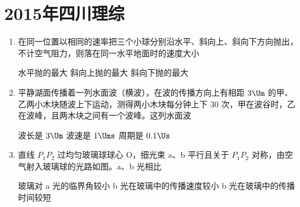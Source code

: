 \documentclass[\gkver]{gaokaozhenti}
\begin{document}
\chapter{2015年四川理综}

\begin{enumerate}
\item
在同一位置以相同的速率把三个小球分别沿水平、斜向上、斜向下方向抛出，不计空气阻力，则落在同一水平地面时的速度大小

{水平抛的最大}
{斜向上抛的最大}
{斜向下抛的最大}


\item
平静湖面传播着一列水面波（横波），在波的传播方向上有相距 $3\Um$ 的甲、乙两小木块随波上下运动，测得两小木块每分钟上下 30 次，甲在波谷时，乙在波峰，且两木块之间有一个波峰。这列水面波

{波长是 $3\Um$}
{波速是 $1\Ums$}
{周期是 $0.1\Us$}


\item
直线 $P_{1}P_{2}$ 过均匀玻璃球球心 O，细光束 a、b 平行且关于 $P_{1}P_{2}$ 对称，由空气射入玻璃球的光路如图。a、b 光相比

\onepicture[w=5.45cm]{}

{玻璃对 a 光的临界角较小}
{b 光在玻璃中的传播速度较小}
{b 光在玻璃中的传播时间较短}


\end{enumerate}
\end{document}
